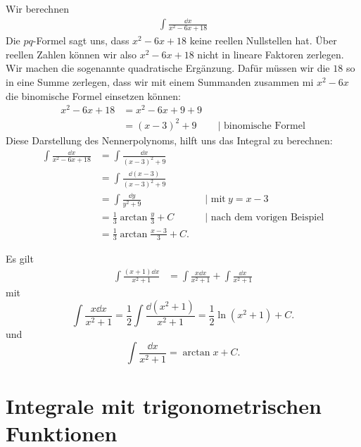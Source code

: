 \begin{bsp} 
	Wir berechnen
	\begin{align*}
	\int \frac{\dd x}{x^2 - 6 x + 18}
	\end{align*} 
	Die $pq$-Formel sagt uns, dass $x^2 - 6 x + 18$ keine reellen Nullstellen hat. Über reellen Zahlen können wir also $x^2 - 6 x + 18$ nicht in lineare Faktoren zerlegen. Wir machen die sogenannte quadratische Ergänzung. Dafür müssen wir die $18$ so in eine Summe zerlegen, dass wir mit einem Summanden zusammen mi $x^2-6 x$ die binomische Formel einsetzen können:
	\begin{align*}
	x^2 - 6 x + 18 & = x^2 - 6 x + 9 + 9 
	\\ & = (x-3)^2 + 9  & &| \text{ binomische Formel}
	\end{align*}
	Diese Darstellung des Nennerpolynoms, hilft uns das Integral zu berechnen: 
	\begin{align*}
	\int \frac{\dd x}{x^2 - 6 x + 18}	 & = \int \frac{\dd x}{(x-3)^2 + 9} 
	\\ & = \int \frac{ \dd (x-3) }{ (x-3)^2 + 9} 
	\\ & = \int \frac{ \dd y }{y^2  + 9} & &| \text{ mit} \ y=x-3
	\\ & = \frac{1}{3} \arctan \frac{y}{3} + C & &| \text{ nach dem vorigen Beispiel}
	\\ & = \frac{1}{3} \arctan \frac{x-3}{3} + C.
	\end{align*} 	
\end{bsp} 

\begin{bsp} 
	Es gilt
	\begin{align*}
	\int \frac{ (x+1) \dd x}{x^2 + 1} & = \int \frac{x \dd x}{x^2+ 1} + \int \frac{ \dd x}{x^2 + 1} 
	\end{align*}
	mit 
	\[
	\int  \frac{x \dd x}{x^2 + 1}  = \frac{1}{2} \int \frac{ \dd (x^2 + 1)}{x^2 + 1} = \frac{1}{2} \ln (x^2 + 1) + C.
	\]
	und 
	\[
	\int \frac{\dd x}{x^2 + 1} = \arctan x + C.
	\]
\end{bsp} 

\section{Integrale mit trigonometrischen Funktionen} 

